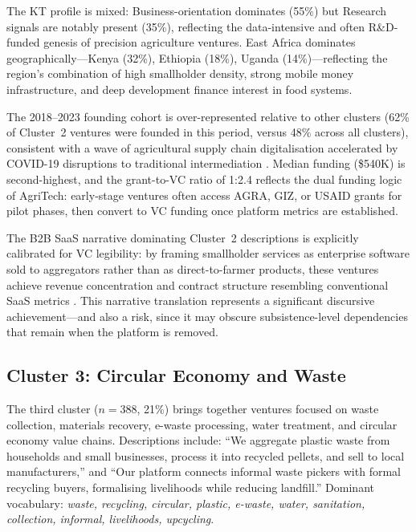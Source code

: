 \documentclass[review,12pt]{elsarticle}
\begin{document}
The KT profile is mixed: Business-orientation dominates (55\%) but
Research signals are notably present (35\%), reflecting the
data-intensive and often R\&D-funded genesis of precision agriculture
ventures. East Africa dominates geographically---Kenya (32\%),
Ethiopia (18\%), Uganda (14\%)---reflecting the region's combination
of high smallholder density, strong mobile money infrastructure, and
deep development finance interest in food systems.

The 2018--2023 founding cohort is over-represented relative to other
clusters (62\% of Cluster~2 ventures were founded in this period,
versus 48\% across all clusters), consistent with a wave of
agricultural supply chain digitalisation accelerated by COVID-19
disruptions to traditional intermediation \citep{nambisan2019entrepreneurship}.
Median funding (\$540K) is second-highest, and the grant-to-VC ratio
of 1:2.4 reflects the dual funding logic of AgriTech: early-stage
ventures often access AGRA, GIZ, or USAID grants for pilot phases,
then convert to VC funding once platform metrics are established.

The B2B SaaS narrative dominating Cluster~2 descriptions is
explicitly calibrated for VC legibility: by framing smallholder
services as enterprise software sold to aggregators rather than as
direct-to-farmer products, these ventures achieve revenue
concentration and contract structure resembling conventional SaaS
metrics \citep{nambisan2017digital}. This narrative translation
represents a significant discursive achievement---and also a risk,
since it may obscure subsistence-level dependencies that remain when
the platform is removed.

\subsection{Cluster 3: Circular Economy and Waste}
\label{ssec:c3}

The third cluster ($n = 388$, 21\%) brings together ventures focused
on waste collection, materials recovery, e-waste processing, water
treatment, and circular economy value chains. Descriptions include:
``We aggregate plastic waste from households and small businesses,
process it into recycled pellets, and sell to local manufacturers,''
and ``Our platform connects informal waste pickers with formal
recycling buyers, formalising livelihoods while reducing landfill.''
Dominant vocabulary: \textit{waste, recycling, circular, plastic,
e-waste, water, sanitation, collection, informal, livelihoods,
upcycling}.
\end{document}
